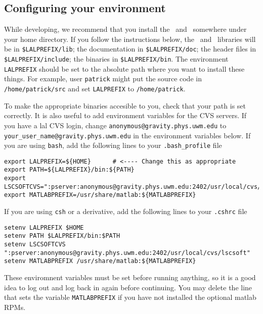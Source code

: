 \color{black}
\subsection{Configuring your environment}\label{ss:config}
\color{black}

While developing,  we recommend that you install the \lal\ and \lalapps\
somewhere under your home directory.  If you follow the
instructions below,  the \lal\ and \lalapps\ libraries will be in
\verb+$LALPREFIX/lib+;  the documentation in \verb+$LALPREFIX/doc+; the header
files in \verb+$LALPREFIX/include+; the binaries in \verb+$LALPREFIX/bin+.
The environment \verb+LALPREFIX+ should be set to the absolute path where you
want to install these things.  For example,  user \texttt{patrick} might put
the source code in \verb+/home/patrick/src+ and set \verb+LALPREFIX+ to
\verb+/home/patrick+.

To make the appropriate binaries accesible to you,  check that your path is
set correctly. It is also useful to add environment variables for the CVS
servers. If you have a lal CVS login, change
\verb+anonymous@gravity.phys.uwm.edu+ to
\verb+your_user_name@gravity.phys.uwm.edu+ in the environment variables below.
If you are using \texttt{bash}, add
the following lines to your \texttt{.bash\_profile} file
\begin{verbatim}
export LALPREFIX=${HOME}      # <---- Change this as appropriate
export PATH=${LALPREFIX}/bin:${PATH}
export LSCSOFTCVS=":pserver:anonymous@gravity.phys.uwm.edu:2402/usr/local/cvs/lscsoft"
export MATLABPREFIX=/usr/share/matlab:${MATLABPREFIX}
\end{verbatim}
If you are using \texttt{csh} or a derivative,  add the following lines to
your \texttt{.cshrc} file
\begin{verbatim}
setenv LALPREFIX $HOME
setenv PATH $LALPREFIX/bin:$PATH
setenv LSCSOFTCVS ":pserver:anonymous@gravity.phys.uwm.edu:2402/usr/local/cvs/lscsoft"
setenv MATLABPREFIX /usr/share/matlab:${MATLABPREFIX}
\end{verbatim}
These enviromnent variables must be set before running anything,
so it is a good idea to log out and log back in again before
continuing. You may delete the line that sets the variable 
\texttt{MATLABPREFIX} if you have not installed the optional matlab RPMs.

\color{black}
